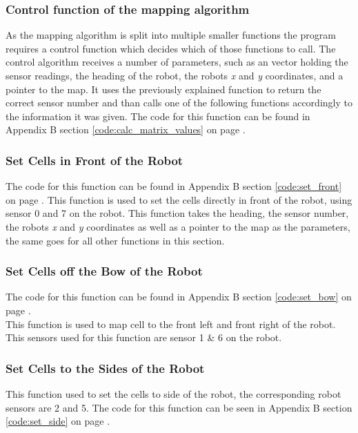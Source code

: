 \subsubsection{Control function of the mapping algorithm}
\label{chap3:calc_matrix_value}
As the mapping algorithm is split into multiple smaller functions the program requires a control function which decides which of those functions to call. 
The control algorithm receives a number of parameters, such as an vector holding the sensor readings, the heading of the robot, the robots \textit{x} and \textit{y} coordinates, and a pointer to the map.
It uses the previously explained function to return the correct sensor number and than calls one of the following functions accordingly to the information it was given. 
The code for this function can be found in Appendix B section \ref{code:calc_matrix_values} on page \pageref{code:calc_matrix_values}.

\subsubsection{Set Cells in Front of the Robot}
\label{chap3:set_front}
The code for this function can be found in Appendix B section \ref{code:set_front} on page \pageref{code:set_front}. 
This function is used to set the cells directly in front of the robot, using sensor 0 and 7 on the robot. This function takes the heading, the sensor number, the robots \textit{x} and \textit{y} coordinates as well as a pointer to the map as the parameters, the same goes for all other functions in this section. \\

\subsubsection{Set Cells off the Bow of the Robot}
The code for this function can be found in Appendix B section \ref{code:set_bow} on page \pageref{code:set_bow}. \\
This function is used to map cell to the front left and front right of the robot. This sensors used for this function are sensor 1 \& 6 on the robot.  

\subsubsection{Set Cells to the Sides of the Robot}
This function used to set the cells to side of the robot, the corresponding robot sensors are 2 and 5. The code for this function can be seen in Appendix B section \ref{code:set_side} on page \pageref{code:set_side}. 

